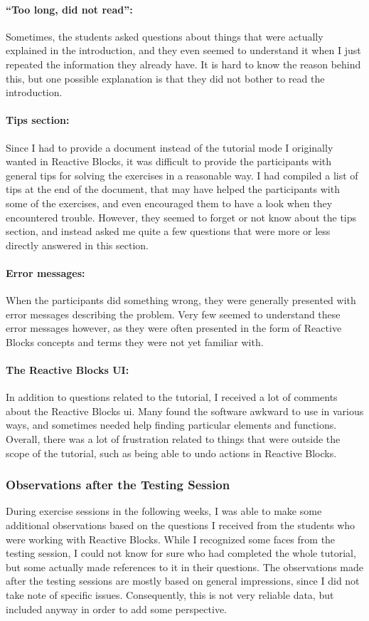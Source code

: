 \paragraph{``Too long, did not read'':} Sometimes, the students asked questions about things that were actually explained in the introduction, and they even seemed to understand it when I just repeated the information they already have. It is hard to know the reason behind this, but one possible explanation is that they did not bother to read the introduction.

\paragraph{Tips section:} Since I had to provide a document instead of the tutorial mode I originally wanted in Reactive Blocks, it was difficult to provide the participants with general tips for solving the exercises in a reasonable way. I had compiled a list of tips at the end of the document, that may have helped the participants with some of the exercises, and even encouraged them to have a look when they encountered trouble. However, they seemed to forget or not know about the tips section, and instead asked me quite a few questions that were more or less directly answered in this section.

\paragraph{Error messages:} When the participants did something wrong, they were generally presented with error messages describing the problem. Very few seemed to understand these error messages however, as they were often presented in the form of Reactive Blocks concepts and terms they were not yet familiar with.

\paragraph{The Reactive Blocks UI:} In addition to questions related to the tutorial, I received a lot of comments about the Reactive Blocks \gls{ui}. Many found the software awkward to use in various ways, and sometimes needed help finding particular elements and functions. Overall, there was a lot of frustration related to things that were outside the scope of the tutorial, such as being able to undo actions in Reactive Blocks.

\subsubsection{Observations after the Testing Session}
During exercise sessions in the following weeks, I was able to make some additional observations based on the questions I received from the students who were working with Reactive Blocks. While I recognized some faces from the testing session, I could not know for sure who had completed the whole tutorial, but some actually made references to it in their questions. The observations made after the testing sessions are mostly based on general impressions, since I did not take note of specific issues. Consequently, this is not very reliable data, but included anyway in order to add some perspective.

